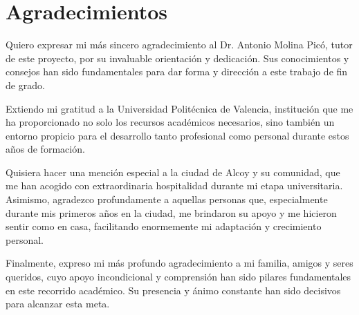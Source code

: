 \chapter{Agradecimientos}

Quiero expresar mi más sincero agradecimiento al Dr. Antonio Molina Picó, tutor de este proyecto, por su invaluable orientación y dedicación. Sus conocimientos y consejos han sido fundamentales para dar forma y dirección a este trabajo de fin de grado.

Extiendo mi gratitud a la Universidad Politécnica de Valencia, institución que me ha proporcionado no solo los recursos académicos necesarios, sino también un entorno propicio para el desarrollo tanto profesional como personal durante estos años de formación.

Quisiera hacer una mención especial a la ciudad de Alcoy y su comunidad, que me han acogido con extraordinaria hospitalidad durante mi etapa universitaria. Asimismo, agradezco profundamente a aquellas personas que, especialmente durante mis primeros años en la ciudad, me brindaron su apoyo y me hicieron sentir como en casa, facilitando enormemente mi adaptación y crecimiento personal. 

Finalmente, expreso mi más profundo agradecimiento a mi familia, amigos y seres queridos, cuyo apoyo incondicional y comprensión han sido pilares fundamentales en este recorrido académico. Su presencia y ánimo constante han sido decisivos para alcanzar esta meta.
